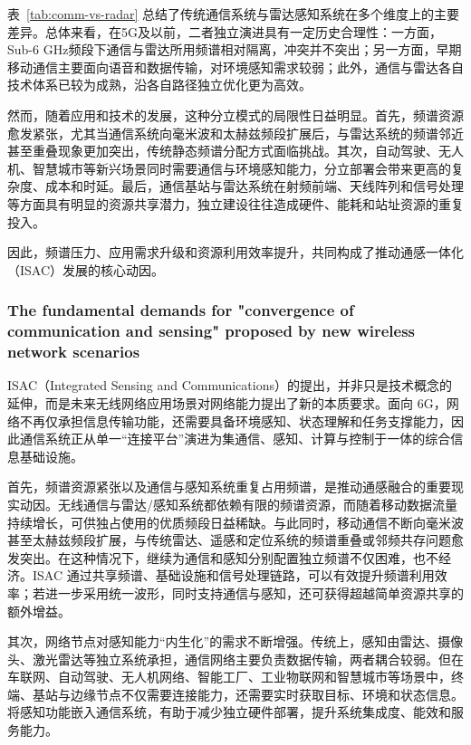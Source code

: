 表~\ref{tab:comm-vs-radar} 总结了传统通信系统与雷达感知系统在多个维度上的主要差异。总体来看，在5G及以前，二者独立演进具有一定历史合理性：一方面，Sub-6 GHz频段下通信与雷达所用频谱相对隔离，冲突并不突出；另一方面，早期移动通信主要面向语音和数据传输，对环境感知需求较弱；此外，通信与雷达各自技术体系已较为成熟，沿各自路径独立优化更为高效。

然而，随着应用和技术的发展，这种分立模式的局限性日益明显。首先，频谱资源愈发紧张，尤其当通信系统向毫米波和太赫兹频段扩展后，与雷达系统的频谱邻近甚至重叠现象更加突出，传统静态频谱分配方式面临挑战\cite{TS38104,Zheng2019RadarCommunicationCoexistence}。其次，自动驾驶、无人机、智慧城市等新兴场景同时需要通信与环境感知能力，分立部署会带来更高的复杂度、成本和时延\cite{Liu2022ISAC,De2021convergent}。最后，通信基站与雷达系统在射频前端、天线阵列和信号处理等方面具有明显的资源共享潜力，独立建设往往造成硬件、能耗和站址资源的重复投入\cite{Liu2020JointRadarComm,Liu2022ISAC}。

因此，频谱压力、应用需求升级和资源利用效率提升，共同构成了推动通感一体化（ISAC）发展的核心动因。


\subsubsection{The fundamental demands for "convergence of communication and sensing" proposed by new wireless network scenarios}
\label{subsubsec:ch1-fundamental demands}

ISAC（Integrated Sensing and Communications）的提出，并非只是技术概念的延伸，而是未来无线网络应用场景对网络能力提出了新的本质要求。面向 6G，网络不再仅承担信息传输功能，还需要具备环境感知、状态理解和任务支撑能力，因此通信系统正从单一“连接平台”演进为集通信、感知、计算与控制于一体的综合信息基础设施\cite{Liu2022ISAC}。

首先，频谱资源紧张以及通信与感知系统重复占用频谱，是推动通感融合的重要现实动因。无线通信与雷达/感知系统都依赖有限的频谱资源，而随着移动数据流量持续增长，可供独占使用的优质频段日益稀缺\cite{ITU_R_RR2024,miit_radio_freq_2026_en}。与此同时，移动通信不断向毫米波甚至太赫兹频段扩展，与传统雷达、遥感和定位系统的频谱重叠或邻频共存问题愈发突出。在这种情况下，继续为通信和感知分别配置独立频谱不仅困难，也不经济。ISAC 通过共享频谱、基础设施和信号处理链路，可以有效提升频谱利用效率；若进一步采用统一波形，同时支持通信与感知，还可获得超越简单资源共享的额外增益\cite{Liu2022ISAC,Hassanien2015dual}。

其次，网络节点对感知能力“内生化”的需求不断增强。传统上，感知由雷达、摄像头、激光雷达等独立系统承担，通信网络主要负责数据传输，两者耦合较弱。但在车联网、自动驾驶、无人机网络、智能工厂、工业物联网和智慧城市等场景中，终端、基站与边缘节点不仅需要连接能力，还需要实时获取目标、环境和状态信息\cite{Zhang2021ISAC6G}。将感知功能嵌入通信系统，有助于减少独立硬件部署，提升系统集成度、能效和服务能力。

